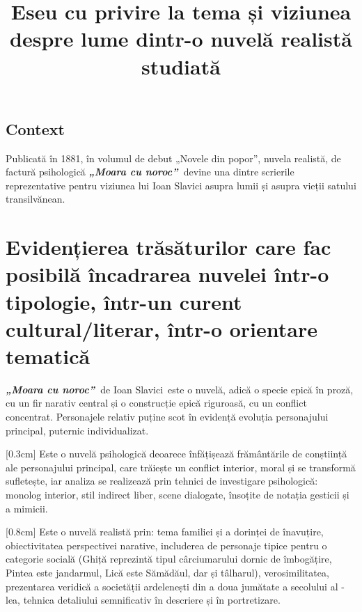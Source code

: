 \documentclass[
12pt,
a4paper
]{article}
\title{Eseu cu privire la tema și viziunea despre lume dintr-o nuvelă realistă studiată}
\date{}   %
\author{} %
\newcommand{\rom}[1]{\uppercase\expandafter{\romannumeral #1\relax}} %
\newcommand{\operatitle}{\textbf{\textit{„Moara cu noroc”\ }}} %
\newcommand{\operaauthor}{Ioan Slavici\ }                               %
\begin{document}
\maketitle %



\subsection{Context}

Publicată în 1881, în volumul de debut „Novele din popor”, nuvela realistă, de factură psihologică \operatitle devine una dintre scrierile reprezentative pentru viziunea lui Ioan Slavici asupra lumii și asupra vieții satului transilvănean.

\section{Evidențierea trăsăturilor care fac posibilă încadrarea nuvelei într-o tipologie, într-un curent cultural/literar, într-o orientare tematică}

\operatitle de \operaauthor este o nuvelă, adică o specie epică în proză, cu un fir narativ central și o construcție epică riguroasă, cu un conflict concentrat. Personajele relativ puține scot în evidență evoluția personajului principal, puternic individualizat.

[0.3cm]
Este o nuvelă psihologică deoarece înfățișează frământările de conștiință ale personajului principal, care trăiește un conflict interior, moral și se transformă sufletește, iar analiza se realizează prin tehnici de investigare psihologică: monolog interior, stil indirect liber, scene dialogate, însoțite de notația gesticii și a mimicii.

[0.8cm]
Este o nuvelă realistă prin: tema familiei și a dorinței de înavuțire, obiectivitatea perspectivei narative, includerea de personaje tipice pentru o categorie socială (Ghiță reprezintă tipul cârciumarului dornic de îmbogățire, Pintea este jandarmul, Lică este Sămădăul, dar și tâlharul), verosimilitatea, prezentarea veridică a societății ardelenești din a doua jumătate a secolului al \rom{19}-lea, tehnica detaliului semnificativ în descriere și în portretizare.
\end{document}
